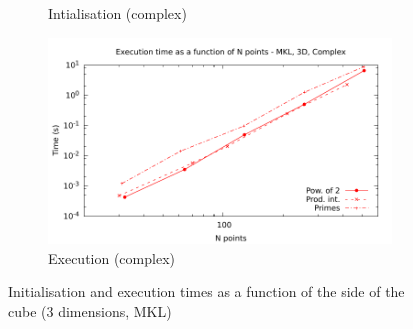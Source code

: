 \documentclass[12pt, a4paper]{article}
\begin{document}
\begin{figure}[H]
\begin{subfigure}{.5\textwidth}
\caption{Intialisation (complex)}
\label{3DMKLCI}
\end{subfigure}%
\begin{subfigure}{.5\textwidth}
\centering
\includegraphics[width=.9\linewidth]{graphs/3d-mkl-exec-c.pdf}
\caption{Execution (complex)}
\label{3DMKLC}
\end{subfigure}
\caption{Initialisation and execution times as a function of the side of the cube (3 dimensions, MKL)}
\label{3DMKL}
\end{figure}
\end{document}
